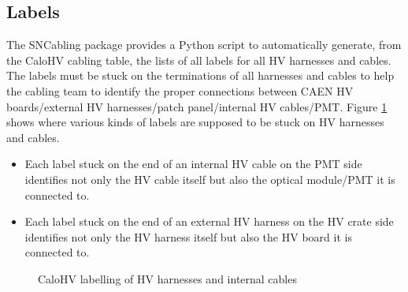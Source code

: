 \subsection{Labels}

The  SNCabling  package  provides  a Python  script  to  automatically
generate, from the  CaloHV cabling table, the lists of  all labels for
all  HV  harnesses and  cables.   The  labels  must  be stuck  on  the
terminations of all  harnesses and cables to help the  cabling team to
identify  the proper  connections between  CAEN HV  boards/external HV
harnesses/patch     panel/internal      HV     cables/PMT.      Figure
\ref{fig:calohv:labels:1}  shows where  various  kinds  of labels  are
supposed to be stuck on HV harnesses and cables.

\begin{itemize}
\item Each label  stuck on the end of an  internal HV cable on
the PMT  side identifies  not only  the HV cable  itself but  also the
optical module/PMT it is connected to.
\item Each label  stuck on the end of an  external HV harness on
the HV crate  side identifies  not only  the HV harness  itself but  also the
HV board it is connected to.
\end{itemize}

\begin{figure}[h!]
  \begin{center}
    \scalebox{0.75}{}
  \end{center}
  \caption{CaloHV labelling of HV harnesses and internal cables}
  \label{fig:calohv:labels:1}
\end{figure}

